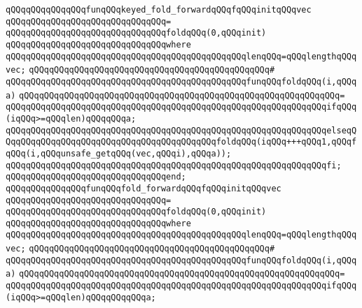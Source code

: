 \newline
\verb|qQQqqQQqqQQqqQQqfunqQQqkeyed_fold_forwardqQQqfqQQqinitqQQqvec|\newline
\verb|qQQqqQQqqQQqqQQqqQQqqQQqqQQqqQQq=|\newline
\verb|qQQqqQQqqQQqqQQqqQQqqQQqqQQqqQQqfoldqQQq(0,qQQqinit)|\newline
\verb|qQQqqQQqqQQqqQQqqQQqqQQqqQQqqQQqwhere|\newline
\verb|qQQqqQQqqQQqqQQqqQQqqQQqqQQqqQQqqQQqqQQqqQQqqQQqlenqQQq=qQQqlengthqQQqvec;|\newline
\verb|qQQqqQQqqQQqqQQqqQQqqQQqqQQqqQQqqQQqqQQqqQQqqQQq#|\newline
\verb|qQQqqQQqqQQqqQQqqQQqqQQqqQQqqQQqqQQqqQQqqQQqqQQqfunqQQqfoldqQQq(i,qQQqa)|\newline
\verb|qQQqqQQqqQQqqQQqqQQqqQQqqQQqqQQqqQQqqQQqqQQqqQQqqQQqqQQqqQQqqQQq=|\newline
\verb|qQQqqQQqqQQqqQQqqQQqqQQqqQQqqQQqqQQqqQQqqQQqqQQqqQQqqQQqqQQqqQQqifqQQq(iqQQq>=qQQqlen)qQQqqQQqa;|\newline
\verb|qQQqqQQqqQQqqQQqqQQqqQQqqQQqqQQqqQQqqQQqqQQqqQQqqQQqqQQqqQQqqQQqelseqQQqqQQqqQQqqQQqqQQqqQQqqQQqqQQqqQQqqQQqqQQqfoldqQQq(iqQQq+++qQQq1,qQQqfqQQq(i,qQQqunsafe_getqQQq(vec,qQQqi),qQQqa));|\newline
\verb|qQQqqQQqqQQqqQQqqQQqqQQqqQQqqQQqqQQqqQQqqQQqqQQqqQQqqQQqqQQqqQQqfi;|\newline
\verb|qQQqqQQqqQQqqQQqqQQqqQQqqQQqqQQqend;|\newline
\newline
\verb|qQQqqQQqqQQqqQQqfunqQQqfold_forwardqQQqfqQQqinitqQQqvec|\newline
\verb|qQQqqQQqqQQqqQQqqQQqqQQqqQQqqQQq=|\newline
\verb|qQQqqQQqqQQqqQQqqQQqqQQqqQQqqQQqfoldqQQq(0,qQQqinit)|\newline
\verb|qQQqqQQqqQQqqQQqqQQqqQQqqQQqqQQqwhere|\newline
\verb|qQQqqQQqqQQqqQQqqQQqqQQqqQQqqQQqqQQqqQQqqQQqqQQqlenqQQq=qQQqlengthqQQqvec;|\newline
\verb|qQQqqQQqqQQqqQQqqQQqqQQqqQQqqQQqqQQqqQQqqQQqqQQq#|\newline
\verb|qQQqqQQqqQQqqQQqqQQqqQQqqQQqqQQqqQQqqQQqqQQqqQQqfunqQQqfoldqQQq(i,qQQqa)|\newline
\verb|qQQqqQQqqQQqqQQqqQQqqQQqqQQqqQQqqQQqqQQqqQQqqQQqqQQqqQQqqQQqqQQq=|\newline
\verb|qQQqqQQqqQQqqQQqqQQqqQQqqQQqqQQqqQQqqQQqqQQqqQQqqQQqqQQqqQQqqQQqifqQQq(iqQQq>=qQQqlen)qQQqqQQqqQQqa;|\newline

